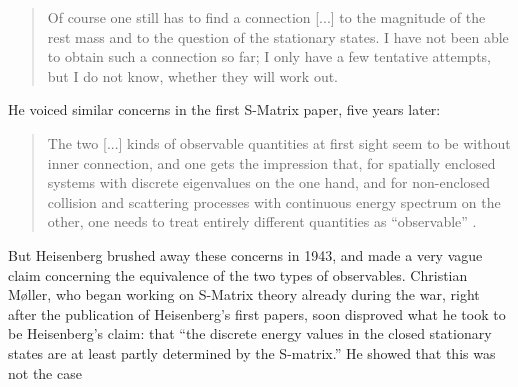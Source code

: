 \documentclass[12pt]{article}
\begin{document}
 \begin{quote}
 Of course one still has to find a connection [...] to the magnitude of the rest mass and to the question of the stationary states. I have not been able to obtain such a connection so far; I only have a few tentative attempts, but I do not know, whether they will work out.
 \end{quote}
 
 He voiced similar concerns in the first S-Matrix paper, five years later:
 
 \begin{quote}
 The two [...] kinds of observable quantities at first sight seem to be without inner connection, and one gets the impression that, for spatially enclosed systems with discrete eigenvalues on the one hand, and for non-enclosed collision and scattering processes with continuous energy spectrum on the other, one needs to treat entirely different quantities as ``observable'' .
 \end{quote}
 
But Heisenberg brushed away these concerns in 1943, and made a very vague claim concerning the equivalence of the two types of observables. Christian M\o ller, who began working on S-Matrix theory already during the war, right after the publication of Heisenberg's first papers, soon disproved what he took to be Heisenberg's claim: that ``the discrete energy values in the closed stationary states are at least partly determined by the S-matrix.'' He showed that this was not the case \citep[p. 18]{moller_1945_general}
 
\end{document}
